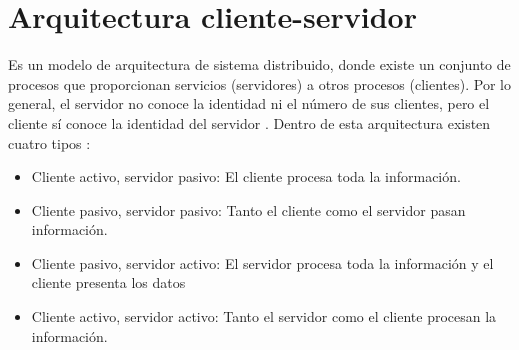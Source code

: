 \section{Arquitectura cliente-servidor} \label{sect:Patrones de arquitectura}

Es un modelo de arquitectura de sistema distribuido, donde existe un conjunto de procesos que proporcionan servicios (servidores) a otros procesos (clientes). Por lo general, el servidor no conoce la identidad ni el número de sus clientes, pero el cliente sí conoce la identidad del servidor \cite{ACS0}. Dentro de esta arquitectura existen cuatro tipos \cite{ACS1}:

\begin{itemize}
\item Cliente activo, servidor pasivo: El cliente procesa toda la información.
\item Cliente pasivo, servidor pasivo: Tanto el cliente como el servidor pasan información.
\item Cliente pasivo, servidor activo: El servidor procesa toda la información y el cliente presenta los datos
\item Cliente activo, servidor activo: Tanto el servidor como el cliente procesan la información.
\end{itemize}